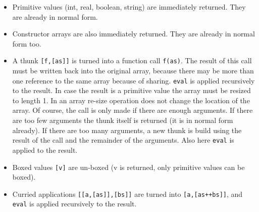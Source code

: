 \begin{itemize}
\item Primitive values (int, real, boolean, string) are immediately returned. They are already in normal form.
\item Constructor arrays  are also immediately returned. They are already in normal form too.
\item A thunk \texttt{[f,[as]]} is turned into a function call \texttt{f(as)}.
The result of this call must be written back into the original array, because there may be more than
one reference to the same array because of sharing. 
\texttt{eval} is applied recursively to the result.
In case the result is a primitive value the array must be resized to length 1.
In \JS an array re-size operation does not change the location of the array.  
Of course, the call is only made if there are enough arguments. 
If there are too few arguments the thunk itself is returned (it is in normal form already).
If there are too many arguments, a new thunk
is build using the result of the call and the remainder of the arguments.
Also here \texttt{eval} is applied to the result. 
\item Boxed values \texttt{[v]} are un-boxed (v is returned, only primitive values can be boxed).
\item Curried applications \texttt{[[a,[as]],[bs]]} are turned into  \texttt{[a,[as++bs]]}, and
\texttt{eval} is applied recursively to the result.
\end{itemize}

